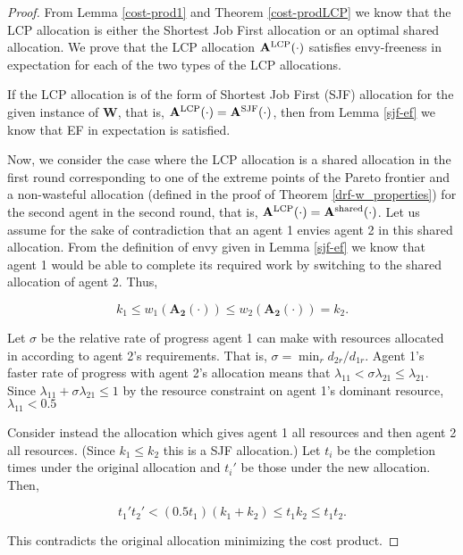 \documentclass[letterpaper]{article} %
\theoremstyle{definition}
\begin{document}
\begin{proof}
From Lemma \ref{cost-prod1} and Theorem \ref{cost-prodLCP} we know that the LCP allocation is either the Shortest Job First allocation or an optimal shared allocation. We prove that the LCP allocation $\mathbf{A}^{\textnormal{LCP}}(\cdot)$ satisfies envy-freeness in expectation for each of the two types of the LCP allocations.

If the LCP allocation is of the form of Shortest Job First (SJF) allocation for the given instance of $\mathbf{W}$, that is, $\mathbf{A}^{\textnormal{LCP}}(\cdot) = \mathbf{A}^{\textnormal{SJF}}(\cdot)$, then from Lemma \ref{sjf-ef} we know that EF in expectation is satisfied.

Now, we consider the case where the LCP allocation is a shared allocation in the first round corresponding to one of the extreme points of the Pareto frontier and a non-wasteful allocation (defined in the proof of Theorem \ref{drf-w_properties}) for the second agent in the second round, that is, $\mathbf{A}^{\textnormal{LCP}}(\cdot) = \mathbf{A}^{\textnormal{shared}}(\cdot)$.
Let us assume for the sake of contradiction that an agent 1 envies agent 2 in this shared allocation. From the definition of envy given in Lemma \ref{sjf-ef} we know that agent 1 would be able to complete its required work by switching to the shared allocation of agent 2. Thus,
\begin{linenomath}
\begin{equation*}
k_1 \leq w_{1}(\mathbf{A_{2}}(\cdot)) \leq w_{2}(\mathbf{A_{2}}(\cdot)) = k_2.    
\end{equation*}
\end{linenomath}

Let $\sigma$ be the relative rate of progress agent 1 can make with resources allocated in according to agent 2's requirements.  That is, $\sigma = \min_r d_{2r} / d_{1r}$.  Agent 1's faster rate of progress with agent 2's allocation means that $\lambda_{11} < \sigma\lambda_{21} \leq \lambda_{21}$.  Since $\lambda_{11} + \sigma\lambda_{21} \leq 1$ by the resource constraint on agent 1's dominant resource, $\lambda_{11} < 0.5$

Consider instead the allocation which gives agent 1 all resources and then agent 2 all resources.  (Since $k_1 \leq k_2$ this is a SJF allocation.)  Let $t_i$ be the completion times under the original allocation and $t_i'$ be those under the new allocation.  Then,
\begin{linenomath}
\begin{equation*}
t_1't_2' < (0.5 t_1)(k_1 + k_2) \leq t_1k_2 \leq t_1t_2.    
\end{equation*}
\end{linenomath}

This contradicts the original allocation minimizing the cost product.
\end{proof}
\end{document}
